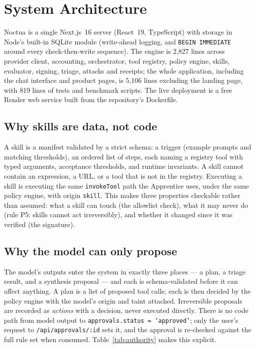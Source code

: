 \documentclass[11pt]{article}
\newcommand{\code}[1]{\texttt{#1}}
\begin{document}
\section{System Architecture}

Noctua is a single Next.js~16 server (React~19, TypeScript) with storage in Node's built-in SQLite module (write-ahead logging, and
\code{BEGIN IMMEDIATE} around every check-then-write sequence). The engine is 2{,}827 lines across provider client,
accounting, orchestrator, tool registry, policy engine, skills, evaluator, signing, triage, attacks and receipts; the
whole application, including the chat interface and product pages, is 5{,}106 lines excluding the landing page, with
819 lines of tests and benchmark scripts. The live deployment is a free Render web service built from the
repository's Dockerfile.

\subsection{Why skills are data, not code}
A skill is a manifest validated by a strict schema: a trigger (example prompts and matching thresholds), an ordered
list of steps, each naming a registry tool with typed arguments, acceptance thresholds, and runtime invariants. A
skill cannot contain an expression, a URL, or a tool that is not in the registry. Executing a skill is executing the
same \code{invokeTool} path the Apprentice uses, under the same policy engine, with origin \code{skill}. This makes
three properties checkable rather than assumed: what a skill can touch (the allowlist check), what it may never do
(rule P5: skills cannot act irreversibly), and whether it changed since it was verified (the signature).

\subsection{Why the model can only propose}
The model's outputs enter the system in exactly three places --- a plan, a triage result, and a synthesis proposal ---
and each is schema-validated before it can affect anything. A plan is a list of proposed tool calls; each is then
decided by the policy engine with the model's origin and taint attached. Irreversible proposals are recorded as
\emph{actions} with a decision, never executed directly. There is no code path from model output to
\code{approvals.status = 'approved'}; only the user's request to \code{/api/approvals/:id} sets it, and the approval
is re-checked against the full rule set when consumed. Table~\ref{tab:authority} makes this explicit.
\end{document}
